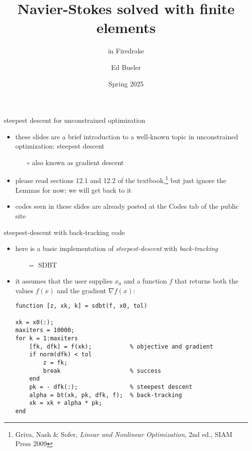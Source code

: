 \documentclass[10pt,hyperref]{beamer}
\title{Navier-Stokes solved with finite elements}
\subtitle{in Firedrake}
\author{Ed Bueler}
\institute{MATH 692 Fluids \& Solids Seminar}
\date{Spring 2025}
\newcommand{\grad}{\nabla}
\begin{document}
\beamertemplatenavigationsymbolsempty

\begin{frame}
  \maketitle
\end{frame}


\begin{frame}{steepest descent for unconstrained optimization}

\begin{itemize}
\item these slides are a brief introduction to a well-known topic in unconstrained optimization: \alert{steepest descent}
    \begin{itemize}
    \item[$\circ$] also known as \alert{gradient descent}
    \end{itemize}
\item please read sections 12.1 and 12.2 of the textbook,\footnote{Griva, Nash \& Sofer, \emph{Linear and Nonlinear Optimization}, 2nd ed., SIAM Press 2009} but just ignore the Lemmas for now; we will get back to it
\item codes seen in these slides are already posted at the Codes tab of the public site
\end{itemize}
\end{frame}



\begin{frame}[fragile]{steepest-descent with back-tracking code}

\begin{itemize}
\item here is a basic implementation of \emph{steepest-descent} with \emph{back-tracking}
    \begin{itemize}
    \item[$=$] SDBT
    \end{itemize}
\item it assumes that the user supplies $x_0$ and a function $f$ that returns both the values $f(x)$ and the gradient $\grad f(x)$:

\medskip
\begin{Verbatim}[fontsize=\small]
function [z, xk, k] = sdbt(f, x0, tol)

xk = x0(:);
maxiters = 10000;
for k = 1:maxiters
    [fk, dfk] = f(xk);           % objective and gradient
    if norm(dfk) < tol
        z = fk;
        break                    % success
    end
    pk = - dfk(:);               % steepest descent
    alpha = bt(xk, pk, dfk, f);  % back-tracking
    xk = xk + alpha * pk;
end
\end{Verbatim}
\end{itemize}
\end{frame}
\end{document}
